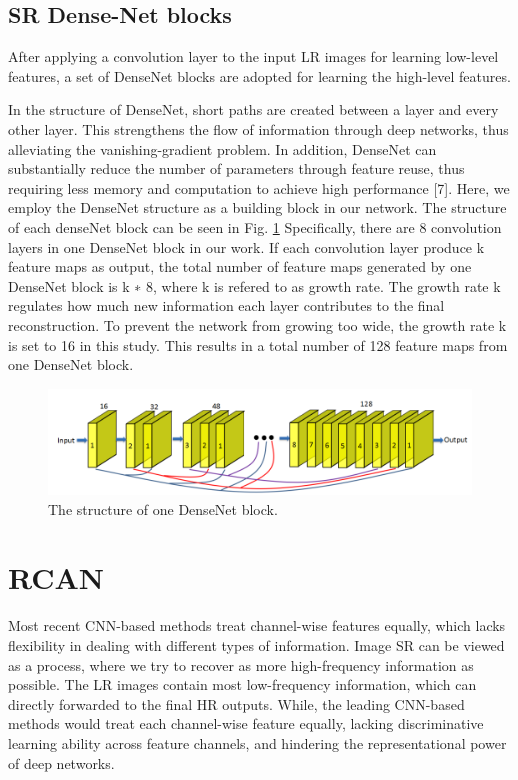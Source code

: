 \subsection{SR Dense-Net blocks}
After applying a convolution layer to the input LR images for learning low-level features, a set of DenseNet blocks are adopted for learning the high-level features.

 In the structure of DenseNet, short paths are created between a layer and every other layer. This strengthens the flow of information through deep networks, thus alleviating the vanishing-gradient problem. In addition, DenseNet can substantially reduce the number of parameters through feature reuse, thus requiring less memory and computation to achieve high performance [7]. Here, we employ the DenseNet structure as a building block in our network. The structure of each denseNet block can be seen in Fig. \ref{fig:test13} Specifically, there are 8 convolution layers in one DenseNet block in our work. If each convolution layer produce k feature maps as output, the total number of feature maps generated by one DenseNet block is k ∗ 8, where k is refered to as growth rate. The growth rate k regulates how much new information each layer contributes to the final reconstruction. To prevent the network from growing too wide, the growth rate k is set to 16 in this study. This results in a total number of 128 feature maps from one DenseNet block. 

\begin{figure}[H]
    \centering
    \includegraphics[totalheight=1.4in]{Chapter5/image22.png}
    \caption{The structure of one DenseNet block.}
    \label{fig:test13}
\end{figure}



\section{RCAN}

Most recent CNN-based methods treat channel-wise features equally, which lacks flexibility in dealing with different types of information. Image SR can be viewed as a process, where we try to recover as more high-frequency information as possible. The LR images contain most low-frequency information, which can directly forwarded to the final HR outputs. While, the leading CNN-based methods would treat each channel-wise feature equally, lacking discriminative learning ability across feature channels, and hindering the representational power of deep networks.  

